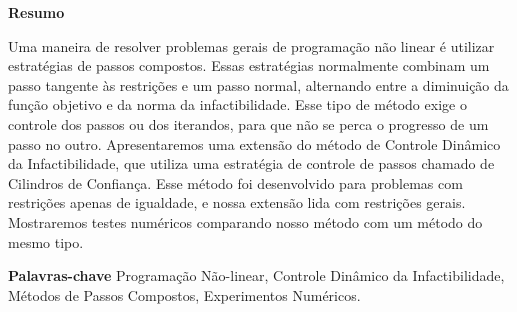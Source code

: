 \begin{center}
  \large{\textbf{Resumo}}
\end{center}

Uma maneira de resolver problemas gerais de programação não linear é utilizar
estratégias de passos compostos. Essas estratégias normalmente combinam um passo
tangente às restrições e um passo normal, alternando entre a diminuição da função
objetivo e da norma da infactibilidade. Esse tipo de método exige o controle
dos passos ou dos iterandos, para que não se perca o progresso de um passo no outro.
Apresentaremos uma extensão do método de Controle Dinâmico da Infactibilidade, que
utiliza uma estratégia de controle de passos chamado de Cilindros de Confiança.
Esse método foi desenvolvido para problemas com restrições apenas de igualdade,
e nossa extensão lida com restrições gerais. Mostraremos testes numéricos comparando
nosso método com um método do mesmo tipo.

\vspace{.2cm}
\textbf{Palavras-chave } Programação Não-linear, Controle Dinâmico da Infactibilidade,
Métodos de Passos Compostos, Experimentos Numéricos.
